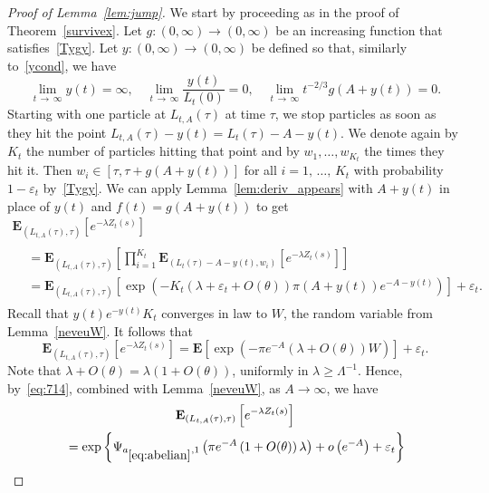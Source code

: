 \documentclass[AHL,Unicode,longabstracts,published]{cedram}
\newcommand*\eps{\varepsilon}
\newcommand*\E{\mathbf{E}}
\newcommand{\1} {\mathds{1}}
\renewcommand*\to{\rightarrow}
\begin{document}
\begin{proof}[Proof of Lemma~\ref{lem:jump}]
We start by proceeding as in the proof of Theorem~\ref{survivex}. Let $g: (0, \infty) \rightarrow (0, \infty)$ be an increasing function that satisfies~\eqref{Tygy}. Let $y: (0, \infty) \rightarrow (0, \infty)$ be defined so that, similarly to~\eqref{ycond}, we have
\[
\lim_{t\,\rightarrow\,\infty} y(t) = \infty, \quad \lim_{t\,\rightarrow\,\infty} \frac{y(t)}{L_t(0)} = 0, \quad \lim_{t\,\rightarrow\,\infty} t^{-2/3} g(A + y(t)) = 0.
\]
Starting with one particle at $L_{t,A}(\tau)$ at time $\tau$, we stop particles as soon as they hit the point $L_{t,A}(\tau)-y(t) = L_t(\tau) - A - y(t)$. We denote again by $K_t$ the number of particles hitting that point and by $w_1,\ldots,w_{K_t}$ the times they hit it. Then $w_i \in [\tau,\tau+g(A + y(t))]$ for all $i=1,\,\ldots,\,K_t$ with probability $1-\eps_t$ by~\eqref{Tygy}. We can apply Lemma~\ref{lem:deriv_appears} with $A + y(t)$ in place of $y(t)$ and $f(t) = g(A + y(t))$ to get
\begin{multline}
\E_{\left(L_{t,A}(\tau),\tau\right)}\left[e^{-\lambda Z_t(s)}\right]\\
\begin{aligned}
&= \E_{\left(L_{t,A}(\tau),\tau\right)}\left[\prod_{i=1}^{K_t} \E_{\left(L_t(\tau) - A - y(t),w_i\right)}\left[e^{-\lambda Z_t(s)}\right]\right]\\
&= \E_{\left(L_{t,A}(\tau),\tau\right)}\left[\exp\left(-K_t \left(\lambda +\eps_t+O(\theta)\right) \pi \left(A+y(t)\right)e^{-A-y(t)}\right)\right]+ \eps_t.
\end{aligned}
\end{multline}
Recall that $y(t)e^{-y(t)} K_t$ converges in law to $W$, the random variable from Lemma~\ref{neveuW}. It follows that
\begin{equation}\label{eq:714}
\E_{\left(L_{t,A}(\tau),\tau\right)}\left[e^{-\lambda Z_t(s)}\right] =
\E\left[\exp\left(-\pi e^{-A}\left(\lambda +O(\theta)\right) W\right)\right] + \eps_t.
\end{equation}
Note that $\lambda + O(\theta) =\lambda(1+O(\theta))$, uniformly in $\lambda\ge \Lambda^{-1}$. Hence, by~\eqref{eq:714}, combined with Lemma~\ref{neveuW}, as $A\to\infty$, we have
\begin{multline}\label{eq:715}
\E_{\left(L_{t,A}(\tau),\tau\right)}\left[e^{-\lambda Z_t(s)}\right]\\
\begin{aligned}
 &= \exp\left\{\Psi_{a_{\eqref{eq:abelian}},1}\left(\pi e^{-A}\left(1 +O(\theta)\right)\lambda\right)+o\left(e^{-A}\right) + \eps_t\right\}\\

\end{aligned}
\end{multline}
\end{proof}
\end{document}
